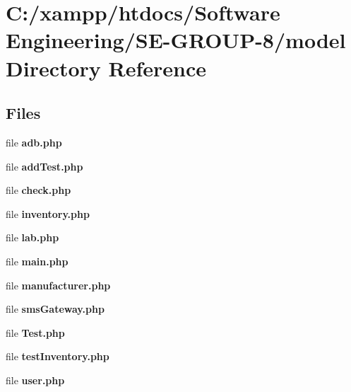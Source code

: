 \section{C\+:/xampp/htdocs/\+Software Engineering/\+S\+E-\/\+G\+R\+O\+U\+P-\/8/model Directory Reference}
\label{dir_177ca456df179f7525fabbc4b0832fce}
\subsection*{Files}
\begin{DoxyCompactItemize}
\item 
file {\bf adb.\+php}
\item 
file {\bf add\+Test.\+php}
\item 
file {\bf check.\+php}
\item 
file {\bf inventory.\+php}
\item 
file {\bf lab.\+php}
\item 
file {\bf main.\+php}
\item 
file {\bf manufacturer.\+php}
\item 
file {\bf sms\+Gateway.\+php}
\item 
file {\bf Test.\+php}
\item 
file {\bf test\+Inventory.\+php}
\item 
file {\bf user.\+php}
\end{DoxyCompactItemize}
